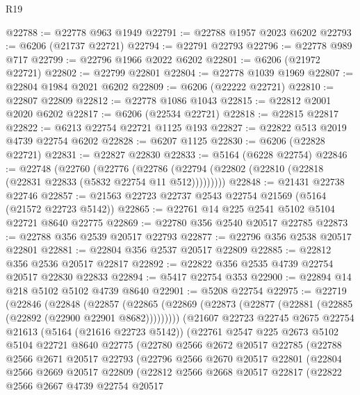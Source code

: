 \begin{lexlean}{R19}
\begin{coremodule}
{{{{{{{{{{{@22788 := @22778 @963 @1949
@22791 := @22788 @1957 @2023 @6202
@22793 := @6206 (@21737 @22721)
@22794 := @22791 @22793
@22796 := @22778 @989 @717
@22799 := @22796 @1966 @2022 @6202
@22801 := @6206 (@21972 @22721)
@22802 := @22799 @22801
@22804 := @22778 @1039 @1969
@22807 := @22804 @1984 @2021 @6202
@22809 := @6206 (@22222 @22721)
@22810 := @22807 @22809
@22812 := @22778 @1086 @1043
@22815 := @22812 @2001 @2020 @6202
@22817 := @6206 (@22534 @22721)
@22818 := @22815 @22817
@22822 := @6213 @22754 @22721 @1125 @193
@22827 := @22822 @513 @2019 @4739 @22754 @6202
@22828 := @6207 @1125
@22830 := @6206 (@22828 @22721)
@22831 := @22827 @22830
@22833 := @5164 (@6228 @22754)
@22846 := @22748
    (@22760
      (@22776 (@22786 (@22794 (@22802 (@22810 (@22818 (@22831 @22833 (@5832 @22754 @11 @512)))))))))
@22848 := @21431 @22738 @22746
@22857 := @21563 @22723 @22737 @2543 @22754 @21569 (@5164 (@21572 @22723 @5142))
@22865 := @22761 @14 @225 @2541 @5102 @5104 @22721 @8640 @22775
@22869 := @22780 @356 @2540 @20517 @22785
@22873 := @22788 @356 @2539 @20517 @22793
@22877 := @22796 @356 @2538 @20517 @22801
@22881 := @22804 @356 @2537 @20517 @22809
@22885 := @22812 @356 @2536 @20517 @22817
@22892 := @22822 @356 @2535 @4739 @22754 @20517 @22830 @22833
@22894 := @5417 @22754 @353
@22900 := @22894 @14 @218 @5102 @5102 @4739 @8640
@22901 := @5208 @22754
@22975 := @22719
    (@22846
      (@22848
        (@22857
          (@22865 (@22869 (@22873 (@22877 (@22881 (@22885 (@22892 (@22900 @22901 @8682)))))))))
        (@21607
          @22723
          @22745
          @2675
          @22754
          @21613
          (@5164 (@21616 @22723 @5142))
          (@22761
            @2547
            @225
            @2673
            @5102
            @5104
            @22721
            @8640
            @22775
            (@22780
              @2566
              @2672
              @20517
              @22785
              (@22788
                @2566
                @2671
                @20517
                @22793
                (@22796
                  @2566
                  @2670
                  @20517
                  @22801
                  (@22804
                    @2566
                    @2669
                    @20517
                    @22809
                    (@22812
                      @2566
                      @2668
                      @20517
                      @22817
                      (@22822
                        @2566
                        @2667
                        @4739
                        @22754
                        @20517
}}}}}}}}}}}
\end{coremodule}
\end{lexlean}
